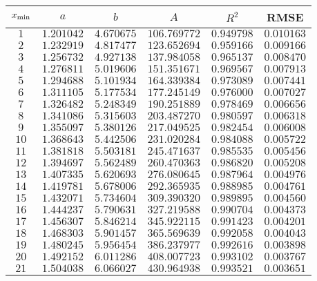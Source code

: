 \begin{tabular}{cccccc} \toprule
$x_{\text{min}}$ & $a$        & $b$        & $A$           & $R^2$      & RMSE       \\\midrule
$1$     & $1.201042$ & $4.670675$ & $106.769772$  & $0.949798$ & $0.010163$ \\
$2$     & $1.232919$ & $4.817477$ & $123.652694$  & $0.959166$ & $0.009166$ \\
$3$     & $1.256732$ & $4.927138$ & $137.984058$  & $0.965137$ & $0.008470$ \\
$4$     & $1.276811$ & $5.019606$ & $151.351671$  & $0.969567$ & $0.007913$ \\
$5$     & $1.294688$ & $5.101934$ & $164.339384$  & $0.973089$ & $0.007441$ \\
$6$     & $1.311105$ & $5.177534$ & $177.245149$  & $0.976000$ & $0.007027$ \\
$7$     & $1.326482$ & $5.248349$ & $190.251889$  & $0.978469$ & $0.006656$ \\
$8$     & $1.341086$ & $5.315603$ & $203.487270$  & $0.980597$ & $0.006318$ \\
$9$     & $1.355097$ & $5.380126$ & $217.049525$  & $0.982454$ & $0.006008$ \\
$10$    & $1.368643$ & $5.442506$ & $231.020284$  & $0.984088$ & $0.005722$ \\
$11$    & $1.381818$ & $5.503181$ & $245.471637$  & $0.985535$ & $0.005456$ \\
$12$    & $1.394697$ & $5.562489$ & $260.470363$  & $0.986820$ & $0.005208$ \\
$13$    & $1.407335$ & $5.620693$ & $276.080645$  & $0.987964$ & $0.004976$ \\
$14$    & $1.419781$ & $5.678006$ & $292.365935$  & $0.988985$ & $0.004761$ \\
$15$    & $1.432071$ & $5.734604$ & $309.390320$  & $0.989895$ & $0.004560$ \\
$16$    & $1.444237$ & $5.790631$ & $327.219588$  & $0.990704$ & $0.004373$ \\
$17$    & $1.456307$ & $5.846214$ & $345.922115$  & $0.991423$ & $0.004201$ \\
$18$    & $1.468303$ & $5.901457$ & $365.569639$  & $0.992058$ & $0.004043$ \\
$19$    & $1.480245$ & $5.956454$ & $386.237977$  & $0.992616$ & $0.003898$ \\
$20$    & $1.492152$ & $6.011286$ & $408.007723$  & $0.993102$ & $0.003767$ \\
$21$    & $1.504038$ & $6.066027$ & $430.964938$  & $0.993521$ & $0.003651$ \\

\end{tabular}
